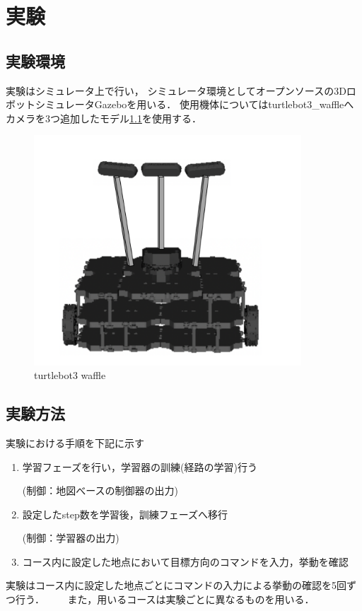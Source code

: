 \chapter{実験}
\section{実験環境}
実験はシミュレータ上で行い，
シミュレータ環境としてオープンソースの3DロボットシミュレータGazebo\cite{gazebo:online}を用いる．
使用機体についてはturtlebot3\_waffle\cite{turtlebot3:online}へカメラを3つ追加したモデル\ref{fig::turtlebot3}を使用する．

\begin{figure}[H]
    \centering
    \includegraphics[width = 10cm]{./figs/3_camera.png}
    \caption{turtlebot3 waffle}
    \label{fig::turtlebot3}
\end{figure}

\section{実験方法}

実験における手順を下記に示す
\begin{enumerate}
  \item 学習フェーズを行い，学習器の訓練(経路の学習)行う　
        
  (制御：地図べースの制御器の出力)
  \item 設定したstep数を学習後，訓練フェーズへ移行　
  
  (制御：学習器の出力)
  \item コース内に設定した地点において目標方向のコマンドを入力，挙動を確認
\end{enumerate}
実験はコース内に設定した地点ごとにコマンドの入力による挙動の確認を5回ずつ行う． 
　　また，用いるコースは実験ごとに異なるものを用いる．

